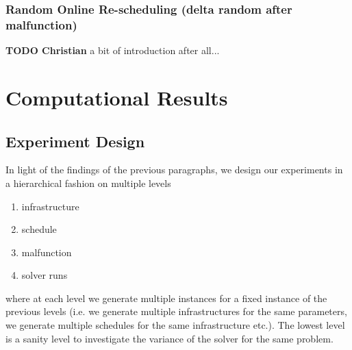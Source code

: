 \documentclass{article}
\begin{document}
\subsubsection{Random Online Re-scheduling (delta random after malfunction)}\label{subsubsec:Deltarandom}
        
\begin{mdframed}
{\bf TODO Christian} a bit of introduction after all...


\end{mdframed}

        
\section{Computational Results}\label{sec:Results}




\subsection{Experiment Design}

In light of the findings of the previous paragraphs, we design our experiments in a hierarchical fashion on multiple levels
\begin{enumerate}
    \item infrastructure
    \item schedule
    \item malfunction
    \item solver runs
\end{enumerate}
where at each level we generate multiple instances for a fixed instance of the previous levels (i.e. we generate multiple infrastructures for the same parameters, we generate multiple schedules for the same infrastructure etc.). The lowest level is a sanity level to investigate the variance of the solver for the same problem.
\end{document}
